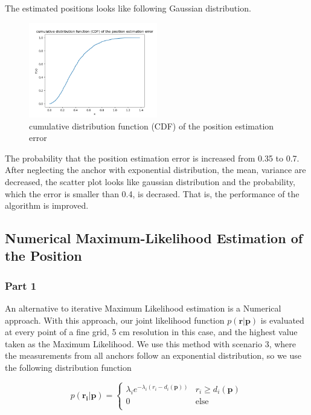 \documentclass[a4paper]{article}
\begin{document}
\noindent
The estimated positions looks like following Gaussian distribution.
\begin{figure}[h]
	\begin{center}		
		\includegraphics[width=0.5\textwidth]{neglect2.png}
		\caption{cumulative distribution function (CDF) of the position estimation error}
	\end{center}
\end{figure}

The probability that the position estimation error is increased from 0.35 to 0.7.\\
After neglecting the anchor with exponential distribution, the mean, variance are decreased, the scatter plot looks like gaussian distribution and the probability, which the error is smaller than 0.4, is decrased. That is, the performance of the algorithm is improved.
\clearpage

\subsection{Numerical Maximum-Likelihood Estimation of the Position}

\subsubsection*{Part 1}
An alternative to iterative Maximum Likelihood estimation is a Numerical approach.  With this approach, our joint likelihood function $p(\bm{r}|\bm{p})$ is evaluated at every point of a fine grid, 5 cm resolution in this case, and the highest value taken as the Maximum Likelihood.  We use this method with scenario 3, where the measurements from all anchors follow an exponential distribution, so we use the following distribution function

\[
	p(\bm{r_i}|\bm{p}) = 
	\begin{cases}
		\lambda _i e^{-\lambda _i (r_i - d_i(\bm{p}))} & r_i \geq d_i(\bm{p}) \\
		0 & \text{else} \\
	\end{cases}
\]
\end{document}
